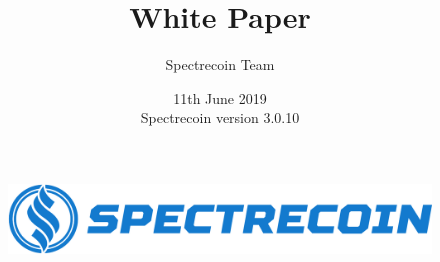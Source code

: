 \documentclass[a4paper,12pt]{article}
\begin{document}
\begin{figure}[h]
	\centering
	\includegraphics[width=\textwidth]{Headline.png}
\end{figure}

\author{Spectrecoin Team}
\title{White Paper}
\date{11th June 2019\\
	Spectrecoin version 3.0.10}

\maketitle
\tableofcontents

\setlength{\arrayrulewidth}{.5mm}
\setlength{\tabcolsep}{8pt}
\renewcommand{\arraystretch}{1.5}


















\end{document}
